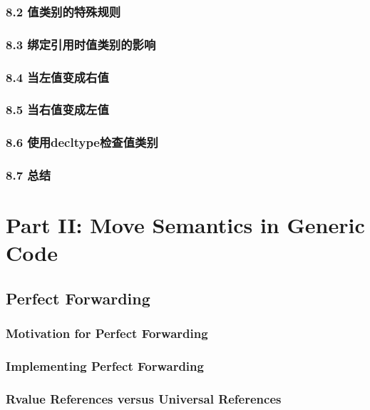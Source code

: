 \documentclass[11pt,a4paper,UTF8]{ctexart}
\begin{document}
		\subsubsection{8.2 值类别的特殊规则}
		
		\subsubsection{8.3 绑定引用时值类别的影响}
		
		\subsubsection{8.4 当左值变成右值}
		
		\subsubsection{8.5 当右值变成左值}
		
		\subsubsection{8.6 使用decltype检查值类别}
		
		\subsubsection{8.7 总结}
		
		
	\section{Part II: Move Semantics in Generic Code}
	\subsection{Perfect Forwarding}
		\subsubsection{Motivation for Perfect Forwarding}
		\subsubsection{Implementing Perfect Forwarding}
		\subsubsection{Rvalue References versus Universal References}
\end{document}
